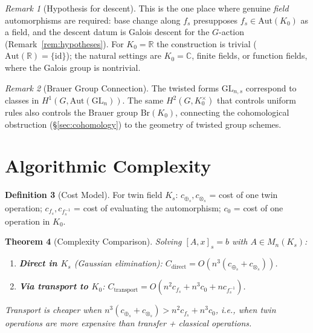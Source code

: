 \documentclass[11pt,twocolumn]{article}
\theoremstyle{plain}
\newtheorem{theorem}{Theorem}
\theoremstyle{definition}
\newtheorem{definition}[theorem]{Definition}
\theoremstyle{remark}
\newtheorem{remark}[theorem]{Remark}
\begin{document}
\begin{remark}[Hypothesis for descent]
This is the one place where genuine \emph{field} automorphisms are required: base change along $f_s$ presupposes $f_s \in \mathrm{Aut}(K_0)$ as a field, and the descent datum is Galois descent for the $G$-action (Remark~\ref{rem:hypotheses}). For $K_0 = \mathbb{R}$ the construction is trivial ($\mathrm{Aut}(\mathbb{R}) = \{\mathrm{id}\}$); the natural settings are $K_0 = \mathbb{C}$, finite fields, or function fields, where the Galois group is nontrivial.
\end{remark}

\begin{remark}[Brauer Group Connection]
The twisted forms $\mathrm{GL}_{n,s}$ correspond to classes in $H^1(G, \mathrm{Aut}(\mathrm{GL}_n))$. The same $H^2(G, K_0^\times)$ that controls uniform rules also controls the Brauer group $\mathrm{Br}(K_0)$, connecting the cohomological obstruction (\S\ref{sec:cohomology}) to the geometry of twisted group schemes.
\end{remark}


\section{Algorithmic Complexity}
\label{sec:complexity}

\begin{definition}[Cost Model]
For twin field $K_s$: $c_{\oplus_s}, c_{\otimes_s}$ = cost of one twin operation; $c_{f_s}, c_{f_s^{-1}}$ = cost of evaluating the automorphism; $c_0$ = cost of one operation in $K_0$.
\end{definition}

\begin{theorem}[Complexity Comparison]\label{thm:complexity}
Solving $[A, x]_s = b$ with $A \in M_n(K_s)$:
\begin{enumerate}[label=(\alph*)]
    \item \textbf{Direct in $K_s$} (Gaussian elimination): $C_{\mathrm{direct}} = O(n^3(c_{\oplus_s} + c_{\otimes_s}))$.
    \item \textbf{Via transport to $K_0$}: $C_{\mathrm{transport}} = O(n^2 c_{f_s} + n^3 c_0 + n c_{f_s^{-1}})$.
\end{enumerate}
Transport is cheaper when $n^3(c_{\oplus_s} + c_{\otimes_s}) > n^2 c_{f_s} + n^3 c_0$, i.e., when twin operations are more expensive than transfer + classical operations.
\end{theorem}
\end{document}

